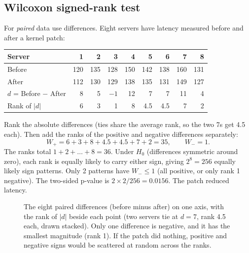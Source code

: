 \subsection{Wilcoxon signed-rank test}

For \emph{paired} data use differences. Eight servers have latency measured
before and after a kernel patch:

\begin{center}
\begin{tabular}{lrrrrrrrr}
\toprule
Server & 1 & 2 & 3 & 4 & 5 & 6 & 7 & 8 \\
\midrule
Before & 120 & 135 & 128 & 150 & 142 & 138 & 160 & 131 \\
After & 112 & 130 & 129 & 138 & 135 & 131 & 149 & 127 \\
$d$ = Before $-$ After & 8 & 5 & $-1$ & 12 & 7 & 7 & 11 & 4 \\
Rank of $|d|$ & 6 & 3 & 1 & 8 & 4.5 & 4.5 & 7 & 2 \\
\bottomrule
\end{tabular}
\end{center}

Rank the absolute differences (ties share the average rank, so the two 7s get
4.5 each). Then add the ranks of the positive and negative differences
separately:
\[
  W_+ = 6 + 3 + 8 + 4.5 + 4.5 + 7 + 2 = 35, \qquad W_- = 1.
\]
The ranks total $1 + 2 + \dots + 8 = 36$. Under $H_0$ (differences symmetric
around zero), each rank is equally likely to carry either sign, giving
$2^8 = 256$ equally likely sign patterns. Only 2 patterns have $W_- \le 1$
(all positive, or only rank 1 negative). The two-sided p-value is
$2 \times 2/256 = 0.0156$. The patch reduced latency.

\begin{figure}[H]
\centering
{}
\caption{The eight paired differences (before minus after) on one axis, with
the rank of $|d|$ beside each point (two servers tie at $d=7$, rank 4.5 each,
drawn stacked). Only one difference is negative, and it has the smallest
magnitude (rank 1). If the patch did nothing, positive and negative signs
would be scattered at random across the ranks.}
\label{fig:cg-signedrank}
\end{figure}

